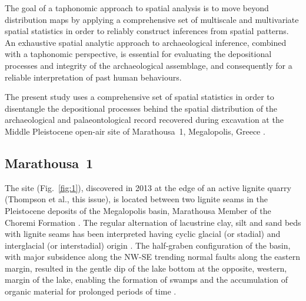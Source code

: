 \documentclass[preprint,authoryear,times]{elsarticle} %
\begin{document}
The goal of a taphonomic approach to spatial analysis is to move beyond distribution maps by applying a comprehensive set of multiscale and multivariate spatial statistics in order to reliably construct inferences from spatial patterns. An exhaustive spatial analytic approach to archaeological inference, combined with a taphonomic perspective, is essential for evaluating the depositional processes and integrity of the archaeological assemblage, and consequently for a reliable interpretation of past human behaviours.

The present study uses a comprehensive set of spatial statistics in order to disentangle the depositional processes behind the spatial distribution of the archaeological and palaeontological record recovered during excavation at the Middle Pleistocene open-air site of Marathousa~1, Megalopolis, Greece \citep{Panagopoulou2015,Harvati2016}.


\subsection{Marathousa~1}

The site (Fig.~\ref{fig:1}), discovered in 2013 at the edge of an active lignite quarry (Thompson et al., this issue), is located between two lignite seams in the Pleistocene deposits of the Megalopolis basin, Marathousa Member of the Choremi Formation \citep{Vugt2000}. The regular alternation of lacustrine clay, silt and sand beds with lignite seams has been interpreted having cyclic glacial (or stadial) and interglacial (or interstadial) origin \citep{Nickel1996}. The half-graben configuration of the basin, with major subsidence along the NW-SE trending normal faults along the eastern margin, resulted in the gentle dip of the lake bottom at the opposite, western, margin of the lake, enabling the formation of swamps and the accumulation of organic material for prolonged periods of time \citep{Vugt2000}.
\end{document}
